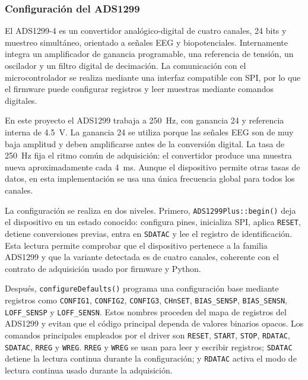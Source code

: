 \subsubsection{Configuración del ADS1299}

El ADS1299-4 es un convertidor analógico-digital de cuatro canales, 24 bits y muestreo simultáneo, orientado a señales EEG y biopotenciales. Internamente integra un amplificador de ganancia programable, una referencia de tensión, un oscilador y un filtro digital de decimación. La comunicación con el microcontrolador se realiza mediante una interfaz compatible con SPI, por lo que el firmware puede configurar registros y leer muestras mediante comandos digitales.

En este proyecto el ADS1299 trabaja a \SI{250}{\hertz}, con ganancia 24 y referencia interna de \SI{4.5}{\volt}. La ganancia 24 se utiliza porque las señales EEG son de muy baja amplitud y deben amplificarse antes de la conversión digital. La tasa de \SI{250}{\hertz} fija el ritmo común de adquisición: el convertidor produce una muestra nueva aproximadamente cada \SI{4}{\milli\second}. Aunque el dispositivo permite otras tasas de datos, en esta implementación se usa una única frecuencia global para todos los canales.

La configuración se realiza en dos niveles. Primero, \texttt{ADS1299Plus::begin()} deja el dispositivo en un estado conocido: configura pines, inicializa SPI, aplica \texttt{RESET}, detiene conversiones previas, entra en \texttt{SDATAC} y lee el registro de identificación. Esta lectura permite comprobar que el dispositivo pertenece a la familia ADS1299 y que la variante detectada es de cuatro canales, coherente con el contrato de adquisición usado por firmware y Python.

Después, \texttt{configureDefaults()} programa una configuración base mediante registros como \texttt{CONFIG1}, \texttt{CONFIG2}, \texttt{CONFIG3}, \texttt{CHnSET}, \texttt{BIAS\_SENSP}, \texttt{BIAS\_SENSN}, \texttt{LOFF\_SENSP} y \texttt{LOFF\_SENSN}. Estos nombres proceden del mapa de registros del ADS1299 y evitan que el código principal dependa de valores binarios opacos. Los comandos principales empleados por el driver son \texttt{RESET}, \texttt{START}, \texttt{STOP}, \texttt{RDATAC}, \texttt{SDATAC}, \texttt{RREG} y \texttt{WREG}. \texttt{RREG} y \texttt{WREG} se usan para leer y escribir registros; \texttt{SDATAC} detiene la lectura continua durante la configuración; y \texttt{RDATAC} activa el modo de lectura continua usado durante la adquisición.

